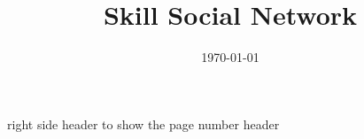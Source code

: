 \documentclass[a4paper, 11pt, oneside]{Thesis}
\begin{document}
\frontmatter

\title  {Skill Social Network} 
\addresses  {\groupname\\\deptname\\\univname} \date       {\today} \subject
{} \keywords   {}

\maketitle

\fancyhead{}  %
right side header to show the page number \lhead{}  %
header

\pagestyle{fancy}
\end{document}

